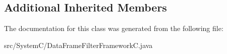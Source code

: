 \subsection*{Additional Inherited Members}


The documentation for this class was generated from the following file\+:\begin{DoxyCompactItemize}
\item 
src/\+System\+C/Data\+Frame\+Filter\+Framework\+C.\+java\end{DoxyCompactItemize}
